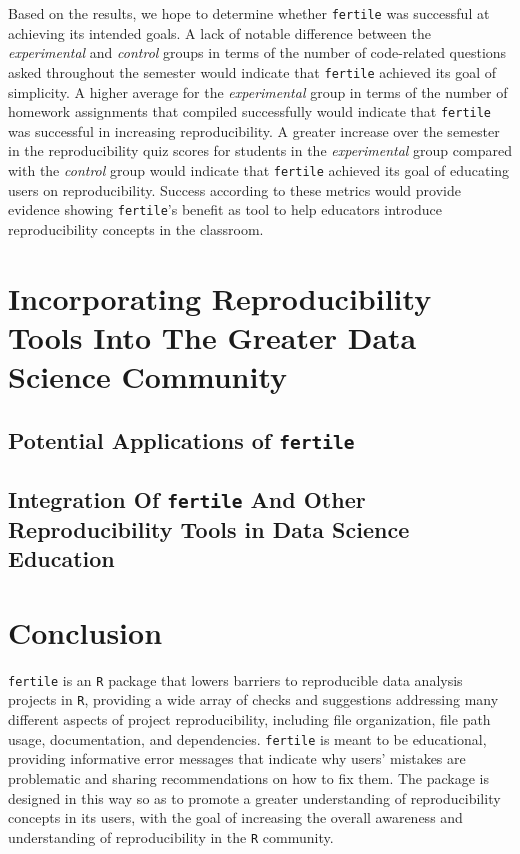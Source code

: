 \documentclass[12pt,twoside]{reedthesis}
\begin{document}
Based on the results, we hope to determine whether \texttt{fertile} was
successful at achieving its intended goals. A lack of notable difference
between the \emph{experimental} and \emph{control} groups in terms of
the number of code-related questions asked throughout the semester would
indicate that \texttt{fertile} achieved its goal of simplicity. A higher
average for the \emph{experimental} group in terms of the number of
homework assignments that compiled successfully would indicate that
\texttt{fertile} was successful in increasing reproducibility. A greater
increase over the semester in the reproducibility quiz scores for
students in the \emph{experimental} group compared with the
\emph{control} group would indicate that \texttt{fertile} achieved its
goal of educating users on reproducibility. Success according to these
metrics would provide evidence showing \texttt{fertile}'s benefit as
tool to help educators introduce reproducibility concepts in the
classroom.

\chapter{Incorporating Reproducibility Tools Into The Greater Data
Science Community}\label{applications}

\section{\texorpdfstring{Potential Applications of
\texttt{fertile}}{Potential Applications of fertile}}\label{potential-applications-of-fertile}

\section{\texorpdfstring{Integration Of \texttt{fertile} And Other
Reproducibility Tools in Data Science
Education}{Integration Of fertile And Other Reproducibility Tools in Data Science Education}}\label{integration-of-fertile-and-other-reproducibility-tools-in-data-science-education}

\chapter*{Conclusion}\label{conclusion}

\texttt{fertile} is an \texttt{R} package that lowers barriers to
reproducible data analysis projects in \texttt{R}, providing a wide
array of checks and suggestions addressing many different aspects of
project reproducibility, including file organization, file path usage,
documentation, and dependencies. \texttt{fertile} is meant to be
educational, providing informative error messages that indicate why
users' mistakes are problematic and sharing recommendations on how to
fix them. The package is designed in this way so as to promote a greater
understanding of reproducibility concepts in its users, with the goal of
increasing the overall awareness and understanding of reproducibility in
the \texttt{R} community.
\end{document}
